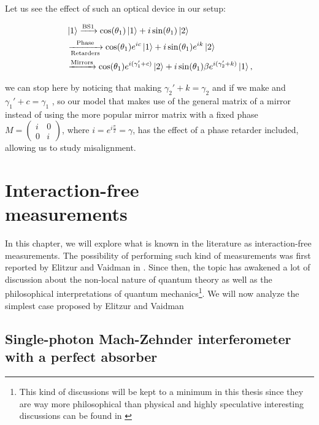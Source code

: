 \documentclass{book}
\begin{document}
Let us see the effect of such an optical device in our setup:

\begin{align*}
&\ket{1}\xrightarrow{\text{BS1}}\cos(\theta_{1})\ket{1}+i\sin(\theta_{1})\ket{2}\\ &\xrightarrow[\text{Retarders}]{\text{Phase}}\cos(\theta_{1})e^{ic}\ket{1}+i\sin(\theta_{1}) e^{ik}\ket{2} \\ &\xrightarrow{\text{Mirrors}} \cos(\theta_{1})e^{i(\gamma_{1}'+c)}\ket{2}+i\sin(\theta_{1})\beta e^{i(\gamma_{2}'+k)}\ket{1},
\end{align*}

we can stop here by noticing that making $\gamma_{2}'+k=\gamma_{2}$ and if we make  and $\gamma_{1}'+c=\gamma_{1}$ , so our model that makes use of the general matrix of a mirror instead of using the more popular mirror matrix with a fixed phase $M=\begin{pmatrix} i & 0\\0& i\end{pmatrix}$, where $i=e^{i \frac{\pi}{2}}=\gamma$, has the  effect of a phase retarder included, allowing us to study misalignment.



\chapter[Interaction-free measurements]{\centering Interaction-free \\ \qquad \quad measurements}


In this chapter, we will explore what is known in the literature as interaction-free measurements. The possibility of performing such kind of measurements was first reported by Elitzur and Vaidman in \cite{Elitzur}. Since then, the topic has awakened a lot of discussion about the non-local nature of quantum theory as well as the philosophical interpretations of quantum mechanics\footnote{ This kind of discussions will be kept to a minimum in this thesis since they are way more philosophical than physical and highly speculative interesting discussions can be found in \cite{paper_vaidman, maudlin} }. We will now analyze the simplest case proposed by Elitzur and Vaidman

\section[Elitzur-Vaidman's bomb detector]{Single-photon Mach-Zehnder interferometer with a perfect absorber}
\end{document}

